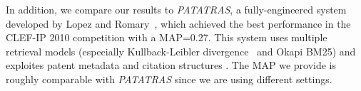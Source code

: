 In addition, we compare our results to \textit{PATATRAS}, a fully-engineered system developed by Lopez and Romary~\cite{lopez2010patatras}, which achieved the best performance in the CLEF-IP 2010 competition with a MAP=0.27. This system uses multiple retrieval models (especially Kullback-Leibler divergence~\cite{Baeza-Yates2011} and Okapi BM25) and exploites patent metadata and citation structures . The MAP we provide is roughly comparable with \textit{PATATRAS} since we are using different settings.
% 